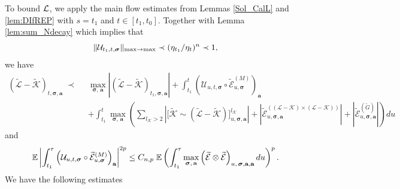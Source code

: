 \documentclass[10pt,reqno]{article}
\theoremstyle{plain} %
\theoremstyle{remark}
\numberwithin{equation}{section}
\begin{document}
To bound $\cal L$, we apply the  main flow estimates from  Lemmas \ref{Sol_CalL} and \ref{lem:DIfREP} with  $s=t_1$ and $t\in [t_1,t_0]$. Together with Lemma \ref{lem:sum_Ndecay} which implies that 
$$
\|{\cal U}_{t_1,t,\boldsymbol{\sigma}}\|_{\max\to\max}\prec (\eta_{t_1}/\eta_{t})^n \prec 1, 
$$
we have 
\begin{align} \label{WLK1}
    (\mathcal{\widetilde{L}} - \mathcal{\widetilde{K}})_{t, \boldsymbol{\sigma}, \textbf{a}} \;\prec \; \; &
    \max_{\boldsymbol{\sigma}, \,\textbf{a}} \left|(\mathcal{\widetilde{L}} - \mathcal{\widetilde{K}})_{t_1, \boldsymbol{\sigma}, \textbf{a}} \right|
    +   \int_{t_1}^t \left(\mathcal{U}_{u, t, \boldsymbol{\sigma}} \circ \mathcal{\widetilde{E}}^{(M)}_{u, \boldsymbol{\sigma}}\right)_{\textbf{a}} \nonumber \\
    &+  \int_{t_1}^t \max_{\boldsymbol{\sigma}, \,\textbf{a}}   \left(\sum_{l_\mathcal{K} > 2} \left|\Big[\mathcal{\widetilde{K}} \sim (\mathcal{\widetilde{L}} - \mathcal{\widetilde{K}})\Big]^{l_\mathcal{K}}_{u, \boldsymbol{\sigma},\textbf{a}} \right|+ 
    \left|\mathcal{\widetilde{E}}^{((\mathcal{L} - \mathcal{K}) \times (\mathcal{L} - \mathcal{K}))}_{u, \boldsymbol{\sigma}, \textbf{a}}\right|
+\left|\mathcal{\widetilde{E}}^{(\widetilde{G})}_{u, \boldsymbol{\sigma}, \textbf{a}}\right|\right)du  \end{align}
and 
 \begin{equation} \label{WLK1.5}
   \mathbb{E} \left| \int_{t_1}^\tau\left(\mathcal{U}_{u, t, \boldsymbol{\sigma}} \circ \mathcal{\widetilde{E}}^{(M)}_{u, \boldsymbol{\sigma}}\right)_{\textbf{a}} \right|^{2p} 
   \le C_{n,p} \; 
   \mathbb{E}  \left(
   \int_{t_1}^\tau 
   \max_{\boldsymbol{\sigma}, \,\textbf{a}}   
   \left( \mathcal{\widetilde{E}} \otimes  \mathcal{\widetilde{E}} \right)
   _{u, \,\boldsymbol{\sigma},{\textbf a}, {\textbf a}}du 
   \right)^{p}. 
  \end{equation} 
We  have the following estimates
\end{document}

